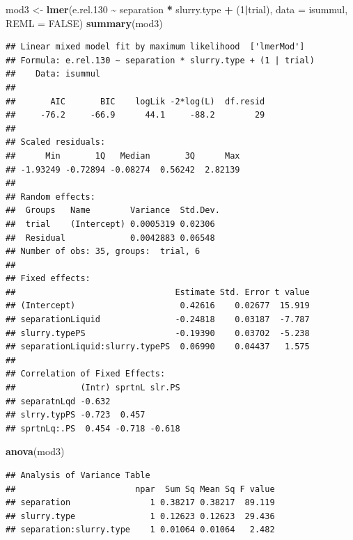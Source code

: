 \documentclass[
]{article}
\newenvironment{Shaded}{\begin{snugshade}}{\end{snugshade}}
\newcommand{\AttributeTok}[1]{\textcolor[rgb]{0.13,0.29,0.53}{#1}}
\newcommand{\ConstantTok}[1]{\textcolor[rgb]{0.56,0.35,0.01}{#1}}
\newcommand{\DecValTok}[1]{\textcolor[rgb]{0.00,0.00,0.81}{#1}}
\newcommand{\FloatTok}[1]{\textcolor[rgb]{0.00,0.00,0.81}{#1}}
\newcommand{\FunctionTok}[1]{\textcolor[rgb]{0.13,0.29,0.53}{\textbf{#1}}}
\newcommand{\NormalTok}[1]{#1}
\newcommand{\OtherTok}[1]{\textcolor[rgb]{0.56,0.35,0.01}{#1}}
\newcommand{\SpecialCharTok}[1]{\textcolor[rgb]{0.81,0.36,0.00}{\textbf{#1}}}
\begin{document}
\begin{Shaded}
\begin{Highlighting}[]
\NormalTok{mod3 }\OtherTok{\textless{}{-}} \FunctionTok{lmer}\NormalTok{(e.rel}\FloatTok{.130} \SpecialCharTok{\textasciitilde{}}\NormalTok{ separation }\SpecialCharTok{*}\NormalTok{ slurry.type }\SpecialCharTok{+}\NormalTok{ (}\DecValTok{1}\SpecialCharTok{|}\NormalTok{trial), }\AttributeTok{data =}\NormalTok{ isummul, }\AttributeTok{REML =} \ConstantTok{FALSE}\NormalTok{)}
\FunctionTok{summary}\NormalTok{(mod3)}
\end{Highlighting}
\end{Shaded}

\begin{verbatim}
## Linear mixed model fit by maximum likelihood  ['lmerMod']
## Formula: e.rel.130 ~ separation * slurry.type + (1 | trial)
##    Data: isummul
## 
##       AIC       BIC    logLik -2*log(L)  df.resid 
##     -76.2     -66.9      44.1     -88.2        29 
## 
## Scaled residuals: 
##      Min       1Q   Median       3Q      Max 
## -1.93249 -0.72894 -0.08274  0.56242  2.82139 
## 
## Random effects:
##  Groups   Name        Variance  Std.Dev.
##  trial    (Intercept) 0.0005319 0.02306 
##  Residual             0.0042883 0.06548 
## Number of obs: 35, groups:  trial, 6
## 
## Fixed effects:
##                                Estimate Std. Error t value
## (Intercept)                     0.42616    0.02677  15.919
## separationLiquid               -0.24818    0.03187  -7.787
## slurry.typePS                  -0.19390    0.03702  -5.238
## separationLiquid:slurry.typePS  0.06990    0.04437   1.575
## 
## Correlation of Fixed Effects:
##             (Intr) sprtnL slr.PS
## separatnLqd -0.632              
## slrry.typPS -0.723  0.457       
## sprtnLq:.PS  0.454 -0.718 -0.618
\end{verbatim}

\begin{Shaded}
\begin{Highlighting}[]
\FunctionTok{anova}\NormalTok{(mod3)}
\end{Highlighting}
\end{Shaded}

\begin{verbatim}
## Analysis of Variance Table
##                        npar  Sum Sq Mean Sq F value
## separation                1 0.38217 0.38217  89.119
## slurry.type               1 0.12623 0.12623  29.436
## separation:slurry.type    1 0.01064 0.01064   2.482
\end{verbatim}
\end{document}
